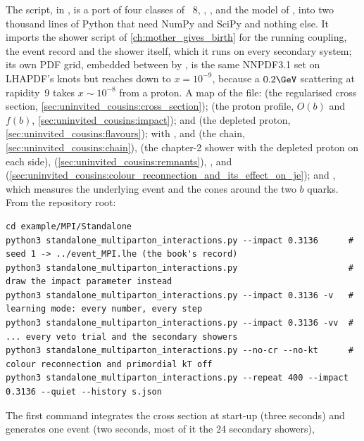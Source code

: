 The script,  in
, is a port of four classes of \PYTHIA~8,
,
,  and the  model of
, into two thousand lines of Python that need NumPy
and SciPy and nothing else. It imports the shower script of
\cref{ch:mother_gives_birth} for the running coupling, the event record and
the shower itself, which it runs on every secondary system; its own PDF
grid, embedded between  by
, is the same NNPDF3.1 set on LHAPDF's knots but
reaches down to $x=10^{-9}$, because a $0.2\GeV$ scattering at rapidity~9
takes $x\sim10^{-8}$ from a proton. A map of the file:  (the
regularised cross section, \cref{sec:uninvited_cousins:cross_section});
 (the proton profile, $O(b)$ and $f(b)$,
\cref{sec:uninvited_cousins:impact});  and  (the
depleted proton, \cref{sec:uninvited_cousins:flavours}); 
with ,  and  (the chain,
\cref{sec:uninvited_cousins:chain}),  (the chapter-2
shower with the depleted proton on each side), 
(\cref{sec:uninvited_cousins:remnants}), ,
 and 
(\cref{sec:uninvited_cousins:colour_reconnection_and_its_effect_on_je});
and , which measures the underlying event and the cones
around the two $b$ quarks. From the repository root:
\begin{verbatim}
cd example/MPI/Standalone
python3 standalone_multiparton_interactions.py --impact 0.3136      # seed 1 -> ../event_MPI.lhe (the book's record)
python3 standalone_multiparton_interactions.py                      # draw the impact parameter instead
python3 standalone_multiparton_interactions.py --impact 0.3136 -v   # learning mode: every number, every step
python3 standalone_multiparton_interactions.py --impact 0.3136 -vv  # ... every veto trial and the secondary showers
python3 standalone_multiparton_interactions.py --no-cr --no-kt      # colour reconnection and primordial kT off
python3 standalone_multiparton_interactions.py --repeat 400 --impact 0.3136 --quiet --history s.json
\end{verbatim}
The first command integrates the cross section at start-up (three seconds)
and generates one event (two seconds, most of it the 24 secondary showers),
